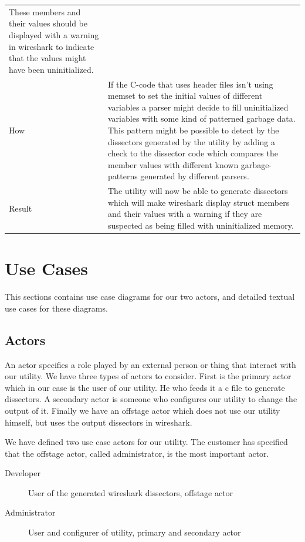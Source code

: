 \begin{table}[htbp]
{\begin{tabularx}{1.2\textwidth}{l X}
 	These members and their values should be displayed with a warning in wireshark to indicate that the values might have been uninitialized.  \\
	How & If the C-code that uses header files isn’t using memset to set the initial values of different variables a parser might decide to fill uninitialized variables with some kind of patterned garbage data.
 	This pattern might be possible to detect by the dissectors generated by the utility by adding a check to the dissector code which compares 	the member values with different known garbage-patterns generated by different parsers. \\
	Result & The utility will now be able to generate dissectors which will make wireshark display struct members and their values with a warning if they are suspected as being filled with uninitialized memory. \\	
	\bottomrule
\end{tabularx}}
\end{table}




\section{Use Cases}
\label{sec:req:usecases}
This sections contains use case diagrams for our two actors, and detailed
textual use cases for these diagrams.

\subsection{Actors}
An actor specifies a role played by an external person or thing that interact
with our \gls{utility}. We have three types of actors to consider. First is the
primary actor which in our case is the user of our \gls{utility}. He who feeds it a
\Gls{c} file to generate \glspl{dissector}. A secondary actor is someone who configures our
\gls{utility} to change the output of it. Finally we have an offstage actor which
does not use our \gls{utility} himself, but uses the output \glspl{dissector} in \Gls{wireshark}.

We have defined two use case actors for our \gls{utility}. The customer has specified
that the offstage actor, called administrator, is the most important actor.
\begin{description}
	\item[Developer] User of the generated \Gls{wireshark} \glspl{dissector}, offstage actor
	\item[Administrator] User and configurer of \gls{utility}, primary and secondary actor
\end{description}

